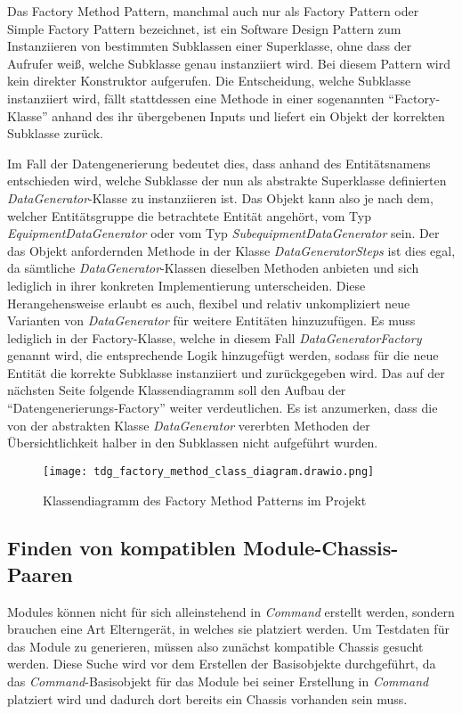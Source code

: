 Das Factory Method Pattern, manchmal auch nur als Factory Pattern oder Simple Factory Pattern bezeichnet, ist ein Software Design Pattern zum Instanziieren von bestimmten Subklassen einer Superklasse, ohne dass der Aufrufer weiß, welche Subklasse genau instanziiert wird. \cite[S. 168]{metsker:2006} \cite[S. 22]{stelting:2002} Bei diesem Pattern wird kein direkter Konstruktor aufgerufen. Die Entscheidung, welche Subklasse instanziiert wird, fällt stattdessen eine Methode in einer sogenannten \enquote{Factory-Klasse} anhand des ihr übergebenen Inputs und liefert ein Objekt der korrekten Subklasse zurück. \cite[S. 19f.]{cooper:2000}

Im Fall der Datengenerierung bedeutet dies, dass anhand des Entitätsnamens entschieden wird, welche Subklasse der nun als abstrakte Superklasse definierten \textit{DataGenerator}-Klasse zu instanziieren ist. Das Objekt kann also je nach dem, welcher Entitätsgruppe die betrachtete Entität angehört, vom Typ \textit{EquipmentDataGenerator} oder vom Typ \textit{SubequipmentDataGenerator} sein. Der das Objekt anfordernden Methode in der Klasse \textit{DataGeneratorSteps} ist dies egal, da sämtliche \textit{DataGenerator}-Klassen dieselben Methoden anbieten und sich lediglich in ihrer konkreten Implementierung unterscheiden. Diese Herangehensweise erlaubt es auch, flexibel und relativ unkompliziert neue Varianten von \textit{DataGenerator} für weitere Entitäten hinzuzufügen. Es muss lediglich in der Factory-Klasse, welche in diesem Fall \textit{DataGeneratorFactory} genannt wird, die entsprechende Logik hinzugefügt werden, sodass für die neue Entität die korrekte Subklasse instanziiert und zurückgegeben wird. Das auf der nächsten Seite folgende Klassendiagramm soll den Aufbau der \enquote{Datengenerierungs-Factory} weiter verdeutlichen. Es ist anzumerken, dass die von der abstrakten Klasse \textit{DataGenerator} vererbten Methoden der Übersichtlichkeit halber in den Subklassen nicht aufgeführt wurden.

\begin{figure}[htp]
    \centering
    \texttt{[image: tdg\_factory\_method\_class\_diagram.drawio.png]}
    \caption{Klassendiagramm des Factory Method Patterns im Projekt}
\end{figure}

\newpage
\subsection{Finden von kompatiblen Module-Chassis-Paaren}\label{subsec:findCompatibleTypes}
Modules können nicht für sich alleinstehend in \textit{Command} erstellt werden, sondern brauchen eine Art Elterngerät, in welches sie platziert werden. Um Testdaten für das Module zu generieren, müssen also zunächst kompatible Chassis gesucht werden. Diese Suche wird vor dem Erstellen der Basisobjekte durchgeführt, da das \textit{Command}-Basisobjekt für das Module bei seiner Erstellung in \textit{Command} platziert wird und dadurch dort bereits ein Chassis vorhanden sein muss.

